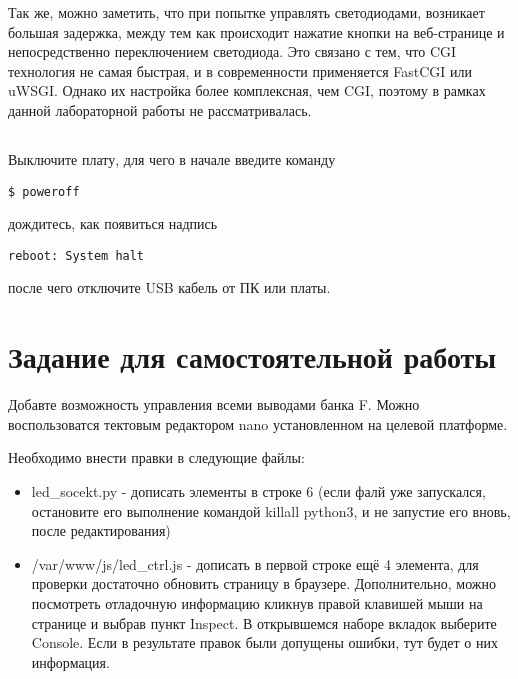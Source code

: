 Так же, можно заметить, что при попытке управлять светодиодами, возникает большая задержка, между тем как происходит нажатие кнопки на веб-странице и непосредственно переключением светодиода. Это связано с тем, что CGI технология не самая быстрая, и в современности применяется FastCGI или uWSGI. Однако их настройка более комплексная, чем CGI, поэтому в рамках данной лабораторной работы не рассматривалась.   

\subsection{} Выключите плату, для чего в начале введите команду
\begin{lstlisting}[style=bash]
	$ poweroff
\end{lstlisting}
дождитесь, как появиться надпись
\begin{lstlisting}[style=stdout]
	reboot: System halt
\end{lstlisting}
после чего отключите USB кабель от ПК или платы. 

\section{Задание для самостоятельной работы}
Добавте возможность управления всеми выводами банка F. Можно воспользоватся тектовым редактором nano установленном на целевой платформе.

Необходимо внести правки в следующие файлы:
\begin{itemize}
	\item led\_socekt.py - дописать элементы в строке 6 (если фалй уже запускался, остановите его выполнение командой killall python3, и не запустие его вновь, после редактирования)
	
	\item /var/www/js/led\_ctrl.js - дописать в первой строке ещё 4 элемента, для проверки достаточно обновить страницу в браузере. Дополнительно, можно посмотреть отладочную информацию кликнув правой клавишей мыши на странице и выбрав пункт Inspect. В открывшемся наборе вкладок выберите Console. Если в результате правок были допущены ошибки, тут будет о них информация. 
	
	
\end{itemize} 